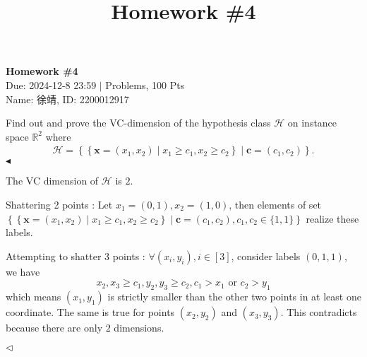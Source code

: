 \documentclass[11pt]{article}
\title{Homework \#4}
\newenvironment{problem}[2][Problem]{\begin{trivlist}
\item[\hskip \labelsep {\bfseries #1}\hskip \labelsep {\bfseries #2.}]}{\hfill$\blacktriangleleft$\end{trivlist}}
\newenvironment{answer}[1][Answer]{\begin{trivlist}
\item[\hskip \labelsep {\bfseries #1.}\hskip \labelsep]}{\hfill$\lhd$\end{trivlist}}
\begin{document}
\pagestyle{fancy}
\chead{}

\begin{center}
    {\LARGE \bf Homework \#4}\\
    {Due: 2024-12-8 23:59 \quad$|$ Problems, 100 Pts}\\
    {Name: 徐靖, ID: 2200012917}            %
\end{center}



\begin{problem}{1 (10')} Find out and prove the VC-dimension of the hypothesis class $\mathcal{H}$ on instance space $\mathbb{R}^2$ where
\begin{align*}
    \mathcal{H}=\left\{\left\{\bm x=(x_1,x_2)\mid x_1\geq c_1, x_2\geq c_2\right\}\mid \bm c=(c_1,c_2)\right\}.
\end{align*}
\end{problem}
\begin{answer}
    The VC dimension of $\mathcal{H}$ is $2$.
    
    Shattering 2 points : Let $x_1 = (0,1),x_2 = (1,0)$, then elements of set $\left\{\left\{\bm x=(x_1,x_2)\mid x_1\geq c_1, x_2\geq c_2\right\}\mid \bm c=(c_1,c_2), c_1,c_2\in \{1,1\}\right\}$ realize these labels.

    Attempting to shatter 3 points : $\forall (x_i,y_i),i\in [3]$, consider labels $(0,1,1)$, we have 
    $$x_2,x_3\ge c_1, y_2,y_3\ge c_2, c_1>x_1 \text{ or } c_2>y_1$$
    which means $(x_1,y_1)$ is strictly smaller than the other two points in at least one coordinate. The same is true for points $(x_2,y_2)$ and $(x_3,y_3)$. This contradicts because there are only $2$ dimensions.
    
\end{answer}
\end{document}
